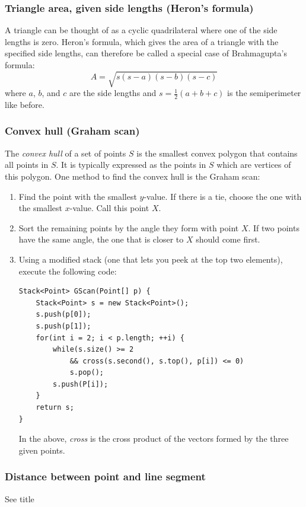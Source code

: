\documentclass[a4paper,12pt]{article}
\begin{document}
\subsubsection{Triangle area, given side lengths (Heron's formula)}
A triangle can be thought of as a cyclic quadrilateral where one of the side lengths is zero. Heron's formula, which gives the area of a triangle with the specified side lengths, can therefore be called a special case of Brahmagupta's formula:
\[A=\sqrt{s(s-a)(s-b)(s-c)}\]
\noindent where $a$, $b$, and $c$ are the side lengths and $s=\frac{1}{2}\left(a+b+c\right)$ is the semiperimeter like before.

\subsubsection{Convex hull (Graham scan)}
The {\em convex hull} of a set of points $S$ is the smallest convex polygon that contains all points in $S$. It is typically expressed as the points in $S$ which are vertices of this polygon. One method to find the convex hull is the Graham scan:

\begin{enumerate}
\item Find the point with the smallest $y$-value. If there is a tie, choose the one with the smallest $x$-value. Call this point $X$.
\item Sort the remaining points by the angle they form with point $X$. If two points have the same angle, the one that is closer to $X$ should come first.
\item Using a modified stack (one that lets you peek at the top two elements), execute the following code:
\begin{lstlisting}
Stack<Point> GScan(Point[] p) {
	Stack<Point> s = new Stack<Point>();
	s.push(p[0]);
	s.push(p[1]);
	for(int i = 2; i < p.length; ++i) {
		while(s.size() >= 2
			&& cross(s.second(), s.top(), p[i]) <= 0)
			s.pop();
		s.push(P[i]);
	}
	return s;
}
\end{lstlisting}

In the above, {\em cross} is the cross product of the vectors formed by the three given points.

\end{enumerate}

\subsubsection{Distance between point and line segment}
See title
\end{document}
